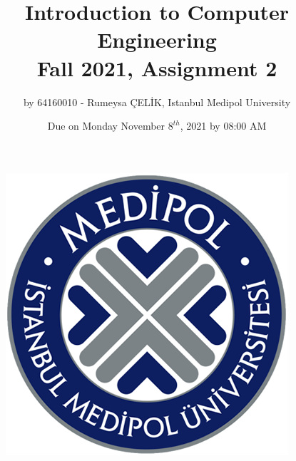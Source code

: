 \documentclass[a4paper, 11pt]{report}
\begin{document}
\begin{figure}
\includegraphics[scale=.63]{medipol.png}
\centering
\end{figure}
\begin{titlepage}
\title{Introduction to Computer Engineering \\ Fall 2021, Assignment 2}
\author{by 64160010 - Rumeysa ÇELİK, Istanbul Medipol University}
\date{Due on Monday November $8^{th}$, 2021 by 08:00 AM}
\maketitle
\end{titlepage}
\end{document}
